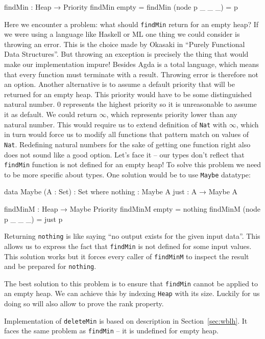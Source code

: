 \begin{code}
findMin : Heap → Priority
findMin empty          = 
findMin (node p _ _ _) = p
\end{code}
\noindent
Here we encounter a problem: what should \texttt{findMin} return for an empty heap? If we were using a language like Haskell or ML one thing we could consider is throwing an error. This is the choice made by Okasaki in ``Purely Functional Data Structures''. But throwing an exception is precisely the thing that would make our implementation impure! Besides Agda is a total language, which means that every function must terminate with a result. Throwing error is therefore not an option. Another alternative is to assume a default priority that will be returned for an empty heap. This priority would have to be some distinguished natural number. $0$ represents the highest priority so it is unreasonable to assume it as default. We could return $\infty$, which represents priority lower than any natural number. This would require us to extend definition of \texttt{Nat} with $\infty$, which in turn would force us to modify all functions that pattern match on values of \texttt{Nat}. Redefining natural numbers for the sake of getting one function right also does not sound like a good option. Let's face it -- our types don't reflect that \texttt{findMin} function is not defined for an empty heap! To solve this problem we need to be more specific about types. One solution would be to use \texttt{Maybe} datatype:

\begin{code}
data Maybe (A : Set) : Set where
  nothing : Maybe A
  just    : A → Maybe A

findMinM : Heap → Maybe Priority
findMinM empty          = nothing
findMinM (node p _ _ _) = just p
\end{code}

\noindent
Returning \texttt{nothing} is like saying ``no output exists for the given input data''. This allows us to express the fact that \texttt{findMin} is not defined for some input values. This solution works but it forces every caller of \texttt{findMinM} to inspect the result and be prepared for \texttt{nothing}.

The best solution to this problem is to ensure that \texttt{findMin} cannot be applied to an empty heap. We can achieve this by indexing \texttt{Heap} with its size. Luckily for us doing so will also allow to prove the rank property.

Implementation of \texttt{deleteMin} is based on description in Section~\ref{sec:wblh}. It faces the same problem as \texttt{findMin} -- it is undefined for empty heap.

